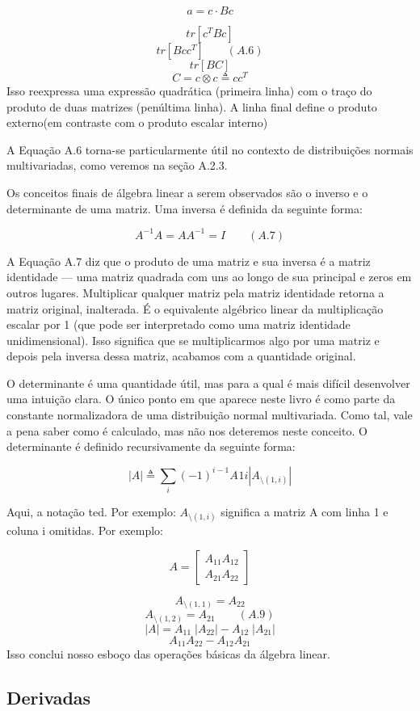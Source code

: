 \documentclass[
  12pt,
]{book}
\begin{document}
\[ a = c \cdot Bc\]

\[ tr[c^T Bc] \]
\[ tr[Bcc^T] \qquad (A.6)\]
\[ tr[BC]\]
\[ C = c \otimes c \triangleq cc^T  \]
Isso reexpressa uma expressão quadrática (primeira linha) com o traço do produto de duas matrizes (penúltima linha). A linha final define o produto externo(em contraste com o produto escalar interno)

A Equação A.6 torna-se particularmente útil no contexto de distribuições normais multivariadas, como veremos na seção A.2.3.

Os conceitos finais de álgebra linear a serem observados são o inverso e o determinante de uma matriz. Uma inversa é definida da seguinte forma:

\[ A^{-1}A = AA^{-1} = I \qquad (A.7)\]

A Equação A.7 diz que o produto de uma matriz e sua inversa é a matriz identidade --- uma matriz quadrada com uns ao longo de sua principal e zeros em outros lugares. Multiplicar qualquer matriz pela matriz identidade retorna a matriz original, inalterada. É o equivalente algébrico linear da multiplicação escalar por 1 (que pode ser interpretado como uma matriz identidade unidimensional). Isso significa que se multiplicarmos algo por uma matriz e depois pela inversa dessa matriz, acabamos com a quantidade original.

O determinante é uma quantidade útil, mas para a qual é mais difícil desenvolver uma intuição clara. O único ponto em que aparece neste livro é como parte da constante normalizadora de uma distribuição normal multivariada. Como tal, vale a pena saber como é calculado, mas não nos deteremos neste conceito. O determinante é definido recursivamente da seguinte forma:

\[ |A| \triangleq \sum_i(-1)^{i-1}A_{}1i | A_{\setminus(1,i)} |  \]

Aqui, a notação ted. Por exemplo:
\(A_{\setminus(1, i)}\) significa a matriz A com linha 1 e coluna i omitidas. Por exemplo:

\[ A = 
\begin{bmatrix} 
  A_{11} A_{12} \\ 
  A_{21} A_{22} 
  \end{bmatrix}
  \]

\[ A_{\setminus(1,1)} = A_{22}\]
\[ A_{\setminus(1,2)} = A_{21} \qquad (A.9)\]
\[ |A| = A_{11} \; |A_{22}| -  A_{12} \;| A_{21}|\]
\[  A_{11}A_{22} - A_{12}A_{21} \]
Isso conclui nosso esboço das operações básicas da álgebra linear.

\hypertarget{derivadas}{%
\subsection{Derivadas}\label{derivadas}}
\end{document}

